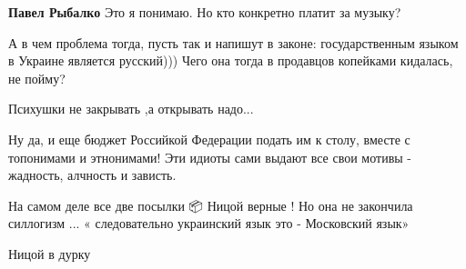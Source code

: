\begin{itemize}
\begin{itemize}
\textbf{Павел Рыбалко} Это я понимаю. Но кто конкретно платит за музыку?
\end{itemize}

 

А в чем проблема тогда, пусть так и напишут в законе: государственным языком в
Украине является русский))) Чего она тогда в продавцов копейками кидалась, не
пойму? 🤣


 
Психушки не закрывать ,а открывать надо...

 

Ну да, и еще бюджет Российкой Федерации подать им к столу, вместе с топонимами
и этнонимами! Эти идиоты сами выдают все свои мотивы - жадность, алчность и
зависть.


 

На самом деле все две посылки 📦 Ницой верные ! Но она не закончила силлогизм ...
« следовательно украинский язык это - Московский язык»

 
Ницой в дурку

 

\end{itemize}
